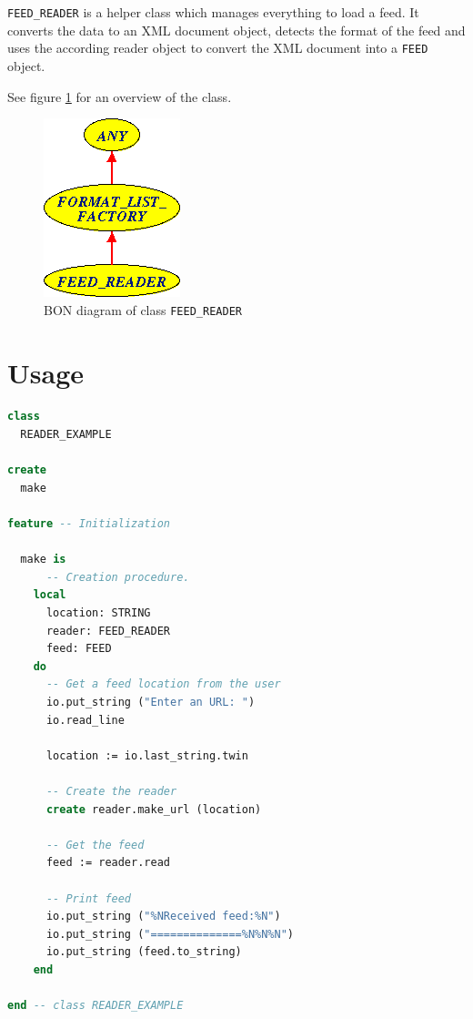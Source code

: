 \texttt{FEED\_READER} is a helper class which manages everything to
load a feed.  It converts the data to an XML document object, detects
the format of the feed and uses the according reader object to convert
the XML document into a \texttt{FEED} object.

See figure \ref{fig:feed-reader} for an overview of the class.

\begin{figure}[htbp]
  \centering
  \includegraphics[scale=.6]{./figures/FEED_READER}
  \caption{BON diagram of class \texttt{FEED\_READER}}
  \label{fig:feed-reader}
\end{figure}


\section{Usage}
\label{sec:feed-reader-usage}

\begin{lstlisting}[language=Eiffel]
class
  READER_EXAMPLE

create
  make

feature -- Initialization

  make is
      -- Creation procedure.
    local
      location: STRING
      reader: FEED_READER
      feed: FEED
    do
      -- Get a feed location from the user
      io.put_string ("Enter an URL: ")
      io.read_line
      
      location := io.last_string.twin
      
      -- Create the reader
      create reader.make_url (location)
      
      -- Get the feed
      feed := reader.read
      
      -- Print feed
      io.put_string ("%NReceived feed:%N")
      io.put_string ("==============%N%N%N")
      io.put_string (feed.to_string)
    end

end -- class READER_EXAMPLE
\end{lstlisting}


